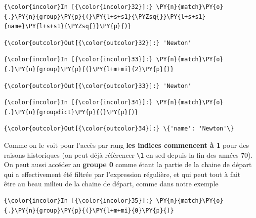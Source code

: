     \begin{Verbatim}[commandchars=\\\{\}]
{\color{incolor}In [{\color{incolor}32}]:} \PY{n}{match}\PY{o}{.}\PY{n}{group}\PY{p}{(}\PY{l+s+s1}{\PYZsq{}}\PY{l+s+s1}{name}\PY{l+s+s1}{\PYZsq{}}\PY{p}{)}
\end{Verbatim}


\begin{Verbatim}[commandchars=\\\{\}]
{\color{outcolor}Out[{\color{outcolor}32}]:} 'Newton'
\end{Verbatim}
            
    \begin{Verbatim}[commandchars=\\\{\}]
{\color{incolor}In [{\color{incolor}33}]:} \PY{n}{match}\PY{o}{.}\PY{n}{group}\PY{p}{(}\PY{l+m+mi}{2}\PY{p}{)}
\end{Verbatim}


\begin{Verbatim}[commandchars=\\\{\}]
{\color{outcolor}Out[{\color{outcolor}33}]:} 'Newton'
\end{Verbatim}
            
    \begin{Verbatim}[commandchars=\\\{\}]
{\color{incolor}In [{\color{incolor}34}]:} \PY{n}{match}\PY{o}{.}\PY{n}{groupdict}\PY{p}{(}\PY{p}{)}
\end{Verbatim}


\begin{Verbatim}[commandchars=\\\{\}]
{\color{outcolor}Out[{\color{outcolor}34}]:} \{'name': 'Newton'\}
\end{Verbatim}
            
    Comme on le voit pour l'accès par rang \textbf{les indices commencent à
1} pour des raisons historiques (on peut déjà référencer
\texttt{\textbackslash{}1} en sed depuis la fin des années 70).\\

On peut aussi accéder au \textbf{groupe 0} comme étant la partie de la
chaine de départ qui a effectivement été filtrée par l'expression
régulière, et qui peut tout à fait être au beau milieu de la chaine de
départ, comme dans notre exemple

    \begin{Verbatim}[commandchars=\\\{\}]
{\color{incolor}In [{\color{incolor}35}]:} \PY{n}{match}\PY{o}{.}\PY{n}{group}\PY{p}{(}\PY{l+m+mi}{0}\PY{p}{)}
\end{Verbatim}


